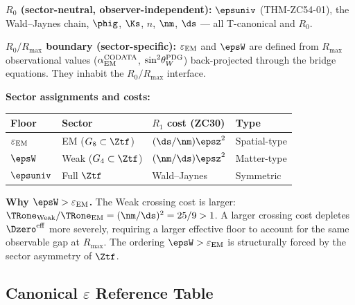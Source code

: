 \documentclass[12pt, a4paper]{article}
\renewcommand{\epsEM}{\varepsilon_{\rm EM}}
\renewcommand{\swsq}{\sin^2\!\theta_W}
\renewcommand{\aEM}{\alpha_{\rm EM}}
\begin{document}
\begin{layerbox}[title={R-Layer Assignments for ZC66}]
\textbf{$R_0$ (sector-neutral, observer-independent):}
$\epsuniv$ (THM-ZC54-01), the Wald--Jaynes chain,
$\phig$, $\Ks$, $n$, $\nm$, $\ds$ --- all T-canonical and $R_0$.

\textbf{$R_0/R_{\max}$ boundary (sector-specific):}
$\epsEM$ and $\epsW$ are defined from $R_{\max}$
observational values ($\aEM^{\rm CODATA}$, $\swsq^{\rm PDG}$)
back-projected through the bridge equations.
They inhabit the $R_0/R_{\max}$ interface.

\textbf{Sector assignments and costs:}
\begin{center}
{\small\renewcommand{\arraystretch}{1.25}
\begin{tabular}{@{}llll@{}}
\toprule
Floor & Sector & $R_1$ cost (ZC30) & Type \\
\midrule
$\epsEM$ & EM ($G_8 \subset \Ztf$)   & $(\ds/\nm)\epsz^{2}$ & Spatial-type \\
$\epsW$  & Weak ($G_4 \subset \Ztf$) & $(\nm/\ds)\epsz^{2}$ & Matter-type \\
$\epsuniv$ & Full $\Ztf$             & Wald--Jaynes          & Symmetric \\
\bottomrule
\end{tabular}
}
\end{center}

\textbf{Why $\epsW > \epsEM$.}
The Weak crossing cost is larger:
$\TRone_{\rm Weak}/\TRone_{\rm EM} = (\nm/\ds)^{2} = 25/9 > 1$.
A larger crossing cost depletes $\Dzero^{\rm eff}$ more severely,
requiring a larger effective floor to account for the
same observable gap at $R_{\max}$.
The ordering $\epsW > \epsEM$ is structurally forced by
the sector asymmetry of $\Ztf$.
\end{layerbox}


\subsection{Canonical $\varepsilon$ Reference Table}
\label{sec:eps-table}
\end{document}
